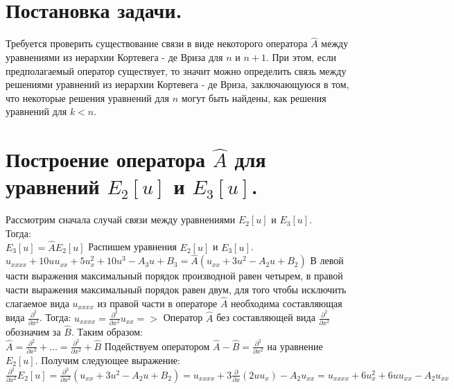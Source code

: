 \documentclass[14pt,a4paper]{article}
\begin{document}
\section{Постановка задачи.}
Требуется проверить существование связи в виде некоторого оператора $\widehat{A}$ между уравнениями из иерархии Кортевега - де Вриза для $n$ и $n + 1$. При этом, если предполагаемый оператор существует, то значит можно определить связь между решениями уравнений из иерархии Кортевега - де Вриза, заключающуюся в том, что некоторые решения уравнений для $n$ могут быть найдены, как решения уравнений для $k < n$. \newline
\section{Построение оператора $\widehat{A}$ для уравнений $E_2 [u]$ и $E_3 [u]$.}
Рассмотрим сначала случай связи между уравнениями $E_2 [u]$ и $E_3 [u]$. \\
Тогда: \\
$E_{3}[u] = \widehat{A} E_{2}[u]$
\newline
Распишем уравнения $E_2 [u]$ и $E_3 [u]$. \\
$u_{xxxx} + 10uu_{xx} + 5 u_{x}^{2} + 10 u^3 - A_{3} u + B_{3} = \widehat{A}(u_{xx} + 3 u^2 - A_{2} u + B_{2})$
\newline
В левой части выражения максимальный порядок производной равен четырем, в правой части выражения максимальный порядок равен двум, для того чтобы исключить слагаемое вида $u_{xxxx}$ из правой части в операторе $\widehat{A}$ необходима составляющая вида $\frac{\partial^2}{\partial x^2}$. Тогда:
\newline
$u_{xxxx} = \frac{\partial^2}{\partial x^2} u_{xx} =>$
\newline
Оператор $\widehat{A}$ без составляющей вида $\frac{\partial^2}{\partial x^2}$ обозначим за $\widehat{B}$. Таким образом: \\ 
$\widehat{A} = \frac{\partial^2}{\partial x^2} + \dots = \frac{\partial^2}{\partial x^2} + \widehat{B}$
\newline
Подействуем оператором $\widehat{A} - \widehat{B} = \frac{\partial^2}{\partial x^2}$ на уравнение $E_2[u]$. Получим следующее выражение: \\
$\frac{\partial^2}{\partial x^2} E_{2} [u] = \frac{\partial^2}{\partial x^2} (u_{xx} + 3 u^2 - A_{2} u + B_{2}) = u_{xxxx} + 3 \frac{\partial}{\partial x} (2uu_{x}) - A_2 u_{xx} = u_{xxxx} + 6u_{x}^{2} + 6uu_{xx} - A_{2}u_{xx}$
\end{document}
